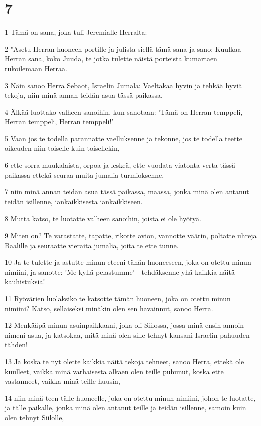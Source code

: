 \chapter{7}

\par 1 Tämä on sana, joka tuli Jeremialle Herralta:
\par 2 "Asetu Herran huoneen portille ja julista siellä tämä sana ja sano: Kuulkaa Herran sana, koko Juuda, te jotka tulette näistä porteista kumartaen rukoilemaan Herraa.
\par 3 Näin sanoo Herra Sebaot, Israelin Jumala: Vaeltakaa hyvin ja tehkää hyviä tekoja, niin minä annan teidän asua tässä paikassa.
\par 4 Älkää luottako valheen sanoihin, kun sanotaan: 'Tämä on Herran temppeli, Herran temppeli, Herran temppeli!'
\par 5 Vaan jos te todella parannatte vaelluksenne ja tekonne, jos te todella teette oikeuden niin toiselle kuin toisellekin,
\par 6 ette sorra muukalaista, orpoa ja leskeä, ette vuodata viatonta verta tässä paikassa ettekä seuraa muita jumalia turmioksenne,
\par 7 niin minä annan teidän asua tässä paikassa, maassa, jonka minä olen antanut teidän isillenne, iankaikkisesta iankaikkiseen.
\par 8 Mutta katso, te luotatte valheen sanoihin, joista ei ole hyötyä.
\par 9 Miten on? Te varastatte, tapatte, rikotte avion, vannotte väärin, poltatte uhreja Baalille ja seuraatte vieraita jumalia, joita te ette tunne.
\par 10 Ja te tulette ja astutte minun eteeni tähän huoneeseen, joka on otettu minun nimiini, ja sanotte: 'Me kyllä pelastumme' - tehdäksenne yhä kaikkia näitä kauhistuksia!
\par 11 Ryövärien luolaksiko te katsotte tämän huoneen, joka on otettu minun nimiini? Katso, sellaiseksi minäkin olen sen havainnut, sanoo Herra.
\par 12 Menkääpä minun asuinpaikkaani, joka oli Siilossa, jossa minä ensin annoin nimeni asua, ja katsokaa, mitä minä olen sille tehnyt kansani Israelin pahuuden tähden!
\par 13 Ja koska te nyt olette kaikkia näitä tekoja tehneet, sanoo Herra, ettekä ole kuulleet, vaikka minä varhaisesta alkaen olen teille puhunut, koska ette vastanneet, vaikka minä teille huusin,
\par 14 niin minä teen tälle huoneelle, joka on otettu minun nimiini, johon te luotatte, ja tälle paikalle, jonka minä olen antanut teille ja teidän isillenne, samoin kuin olen tehnyt Siilolle,

